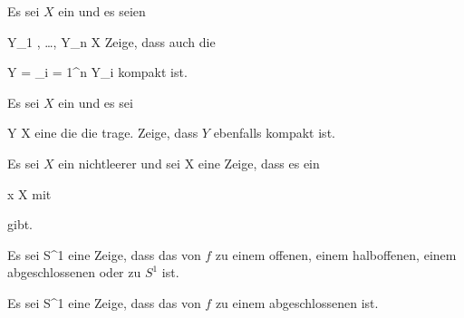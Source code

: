 {}
{

Es sei $X$ ein
und es seien

\mavergleichskette
{\vergleichskette
{Y_1 , \ldots , Y_n
}
{ \subseteq }{ X
}
{  }{
}
{    }{
}
{   }{
}
}
{}{}{}
Zeige, dass auch die

\mavergleichskette
{\vergleichskette
{ Y
}
{ = }{ \bigcup_{i = 1}^n Y_i
}
{  }{
}
{    }{
}
{   }{
}
}
{}{}{}
kompakt ist.

}
{} {}

{}
{

Es sei $X$ ein
und es sei

\mavergleichskette
{\vergleichskette
{Y
}
{ \subseteq }{ X
}
{  }{
}
{    }{
}
{   }{
}
}
{}{}{}
eine
die die
trage. Zeige, dass $Y$ ebenfalls kompakt ist.

}
{} {}

{}
{

Es sei $X$ ein nichtleerer
und sei
 { X } {\R
} {}
eine
Zeige, dass es ein

\mavergleichskette
{\vergleichskette
{ x
}
{ \in }{ X
}
{  }{
}
{    }{
}
{   }{
}
}
{}{}{}
mit

 {  }
 gibt.

}
{} {}

{}
{

Es sei
 {\R} {S^1
} {}
eine
Zeige, dass das
von $f$
zu einem offenen, einem halboffenen, einem abgeschlossenen
oder zu $S^1$ ist.

}
{} {}

{}
{

Es sei
 {S^1} {\R
} {}
eine
Zeige, dass das
von $f$
zu einem abgeschlossenen
ist.

}
{} {}

